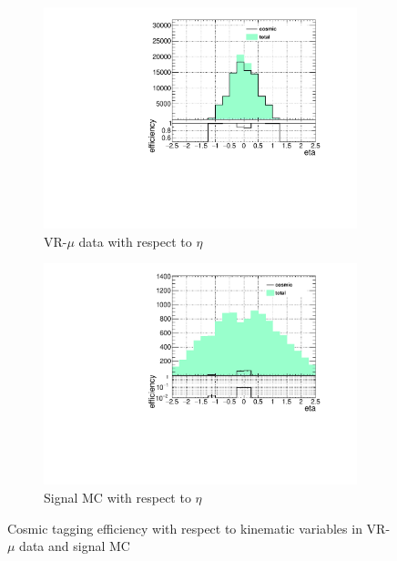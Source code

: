 \begin{figure}[h]
 \begin{subfigure}[b]{0.4\textwidth}
  	\includegraphics[width=\textwidth]{figures/cosmics/wider_tag_ratio_eta.pdf}
  	\caption{VR-$\mu$ data with respect to $\eta$}
  \end{subfigure}
  \begin{subfigure}[b]{0.4\textwidth}
  	\includegraphics[width=\textwidth]{figures/cosmics/mc_300_ratio_eta.pdf}
  	\caption{Signal \ac{MC} with respect to $\eta$}
  \end{subfigure}
    \caption{Cosmic tagging efficiency with respect to kinematic variables in VR-$\mu$ data and signal \ac{MC}}
  \label{fig:cos_eff}
\end{figure}




